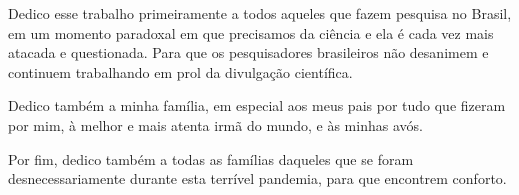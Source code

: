 
Dedico esse trabalho primeiramente a todos aqueles que fazem pesquisa no Brasil, em um momento paradoxal em que precisamos da ciência e ela é cada vez mais atacada e questionada. Para que os pesquisadores brasileiros não desanimem e continuem trabalhando em prol da divulgação científica.

Dedico também a minha família, em especial aos meus pais por tudo que fizeram por mim, à melhor e mais atenta irmã do mundo, e às minhas avós.

Por fim, dedico também a todas as famílias daqueles que se foram desnecessariamente durante esta terrível pandemia, para que encontrem conforto.

